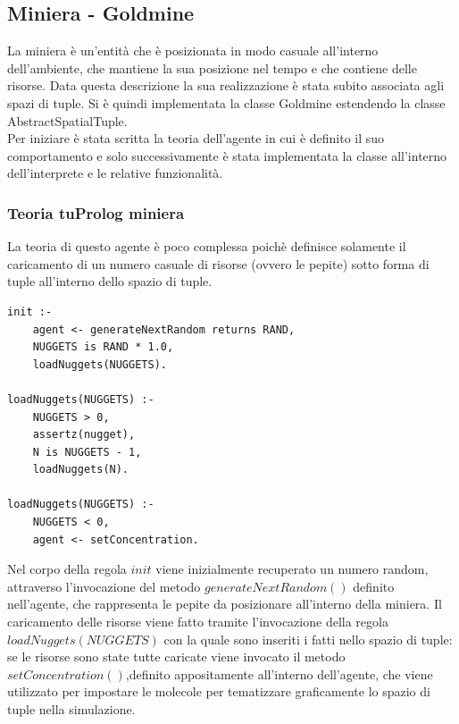 \subsection{Miniera - Goldmine}
La miniera è un'entità che è posizionata in modo casuale all'interno dell'ambiente, che mantiene la sua posizione nel tempo e che contiene delle risorse.
Data questa descrizione la sua realizzazione è stata subito associata agli spazi di tuple. Si è quindi implementata la classe Goldmine estendendo la classe AbstractSpatialTuple.
\\
Per iniziare è stata scritta la teoria dell'agente in cui è definito il suo comportamento e solo successivamente è stata implementata la classe all'interno dell'interprete e le relative funzionalità.

\subsubsection{Teoria tuProlog miniera}
La teoria di questo agente è poco complessa poichè definisce solamente il caricamento di un numero casuale di risorse (ovvero le pepite) sotto forma di tuple all'interno dello spazio di tuple.
\medskip
\begin{lstlisting}[firstnumber=1,label={lst:Goldmine},caption={Teoria miniera}]
init :-
    agent <- generateNextRandom returns RAND,
    NUGGETS is RAND * 1.0,
    loadNuggets(NUGGETS).

loadNuggets(NUGGETS) :-
    NUGGETS > 0,
    assertz(nugget),
    N is NUGGETS - 1,
    loadNuggets(N).

loadNuggets(NUGGETS) :-
    NUGGETS < 0,
    agent <- setConcentration.
\end{lstlisting}

Nel corpo della regola $init$ viene inizialmente recuperato un numero random, attraverso l'invocazione del metodo $generateNextRandom()$ definito nell'agente, che rappresenta le pepite da posizionare all'interno della miniera.
Il caricamento delle risorse viene fatto tramite l'invocazione della regola $loadNuggets(NUGGETS)$ con la quale sono inseriti i fatti nello spazio di tuple: se le risorse sono state tutte caricate viene invocato il metodo $setConcentration()$,definito appositamente all'interno dell'agente, che viene utilizzato per impostare le molecole per tematizzare graficamente lo spazio di tuple nella simulazione.

